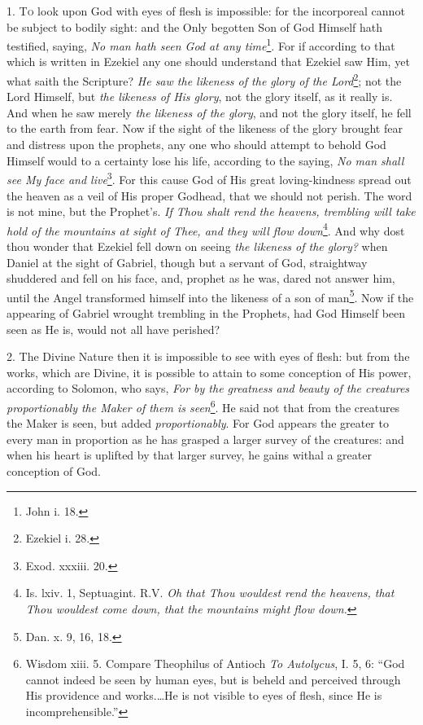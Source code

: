 1. \textsc{To} look upon God with eyes of flesh is impossible: for the incorporeal cannot be subject to bodily sight: and the Only begotten Son of God Himself hath testified, saying, \emph{No man hath seen God at any time}\footnote{John i. 18.}. For if according to that which is written in Ezekiel any one should understand that Ezekiel saw Him, yet what saith the Scripture? \emph{He saw the likeness of the glory of the Lord}\footnote{Ezekiel i. 28.}; not the Lord Himself, but \emph{the likeness of His glory}, not the glory itself, as it really is. And when he saw merely \emph{the likeness of the glory}, and not the glory itself, he fell to the earth from fear. Now if the sight of the likeness of the glory brought fear and distress upon the prophets, any one who should attempt to behold God Himself would to a certainty lose his life, according to the saying, \emph{No man shall see My face and live}\footnote{Exod. xxxiii. 20.}. For this cause God of His great loving-kindness spread out the heaven as a veil of His proper Godhead, that we should not perish. The word is not mine, but the Prophet’s. \emph{If Thou shalt rend the heavens, trembling will take hold of the mountains at sight of Thee, and they will flow down}\footnote{Is. lxiv. 1, Septuagint. R.V. \emph{Oh that Thou wouldest rend the heavens, that Thou wouldest come down, that the mountains might flow down.}}. And why dost thou wonder that Ezekiel fell down on seeing \emph{the likeness of the glory?} when Daniel at the sight of Gabriel, though but a servant of God, straightway shuddered and fell on his face, and, prophet as he was, dared not answer him, until the Angel transformed himself into the likeness of a son of man\footnote{Dan. x. 9, 16, 18.}. Now if the appearing of Gabriel wrought trembling in the Prophets, had God Himself been seen as He is, would not all have perished?

2. The Divine Nature then it is impossible to see with eyes of flesh: but from the works, which are Divine, it is possible to attain to some conception of His power, according to Solomon, who says, \emph{For by the greatness and beauty of the creatures proportionably the Maker of them is seen}\footnote{Wisdom xiii. 5. Compare Theophilus of Antioch \emph{To Autolycus}, I. 5, 6: “God cannot indeed be seen by human eyes, but is beheld and perceived through His providence and works.…He is not visible to eyes of flesh, since He is incomprehensible.”}. He said not that from the creatures the Maker is seen, but added \emph{proportionably}. For God appears the greater to every man in proportion as he has grasped a larger survey of the creatures: and when his heart is uplifted by that larger survey, he gains withal a greater conception of God.

